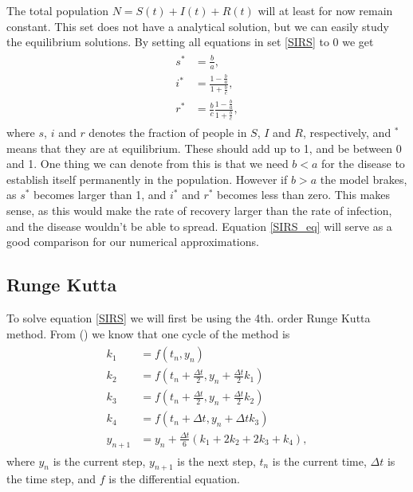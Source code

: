 \documentclass[a4paper]{article}
\let\Oldsubsection\subsection
\renewcommand{\subsection}{\FloatBarrier\Oldsubsection}
\begin{document}
	The total population $N = S(t) + I(t) + R(t)$ will at least for now remain constant. This set does not have a analytical solution, but we can easily study the equilibrium solutions. By setting all equations in set \ref{SIRS} to 0 we get 
	\begin{align} 
	\begin{split}
	s ^ { * } & = \frac { b } { a }, \\ 
	i ^ { * } & = \frac { 1 - \frac { b } { a } } { 1 + \frac { b } { c } }, \\ 
	r ^ { * } & = \frac { b } { c } \frac { 1 - \frac { b } { a } } { 1 +  \frac{b}{c} }, \label{SIRS_eq}
	\end{split} 
	\end{align}
	where $s$, $i$ and $r$ denotes the fraction of people in $S$, $I$ and $R$, respectively, and $^*$ means that they are at equilibrium. These should add up to 1, and be between 0 and 1. 
	One thing we can denote from this is that we need $b < a$ for the disease to establish itself permanently in the population. However if $b>a$ the model brakes, as $s^*$ becomes larger than 1, and $i^*$ and $r^*$ becomes less than zero. This makes sense, as this would make the rate of recovery larger than the rate of infection, and the disease wouldn't be able to spread. 
	Equation \ref{SIRS_eq} will serve as a good comparison for our numerical approximations. 
	
	
	\subsection{Runge Kutta}
	To solve equation \ref{SIRS} we will first be using the 4th. order Runge Kutta method. From (\cite{lecture notes}) we know that one cycle of the method is
	\begin{align}
	\begin{split} 
	k_1 &= f(t_n,y_n) \\
	k_2 &= f(t_n + \frac{\Delta t}{2},y_n + \frac{\Delta t}{2} k_1) \\
	k_3 &= f(t_n + \frac{\Delta t}{2},y_n + \frac{\Delta t}{2} k_2) \\
	k_4 &= f(t_n + \Delta t, y_n + \Delta t k_3) \\
	y_{n+1} &= y_n + \frac{\Delta t}{6} \left( k_1 + 2k_2 + 2k_3 + k_4 \right),
	\end{split} 
	\end{align}
	where $y_n$ is the current step, $y_{n+1}$ is the next step, $t_n$ is the current time, $\Delta t$ is the time step, and $f$ is the differential equation. 
	
\end{document}
